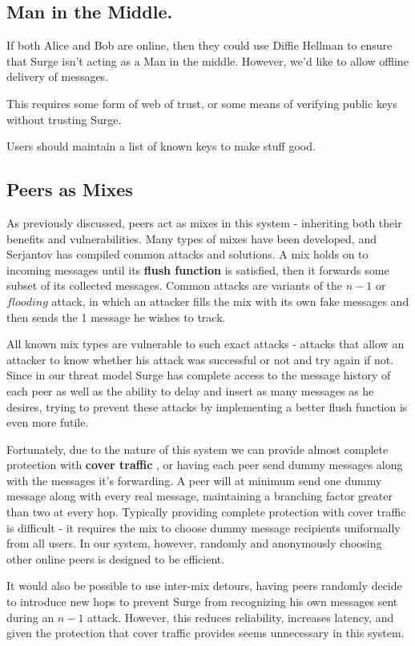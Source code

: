 \documentclass[twocolumn]{paper}
\begin{document}
\subsection{Man in the Middle.} If both Alice and Bob are online, then they could use Diffie Hellman to ensure that Surge isn't acting as a Man in the middle. However, we'd like to allow offline delivery of messages.

This requires some form of web of trust, or some means of verifying public keys without trusting Surge. 

Users should maintain a list of known keys to make stuff good. 

\subsection{Peers as Mixes}
As previously discussed, peers act as mixes in this system - inheriting both their benefits and vulnerabilities. Many types of mixes have been developed, and Serjantov \cite{trickle02} has compiled common attacks and solutions. 
A mix holds on to incoming messages until its \textbf{flush function} is satisfied, then it forwards some subset of its collected messages. Common attacks are variants of the $n - 1$ or $flooding$ attack, in which an attacker fills the mix with its own fake messages and then sends the 1 message he wishes to track. 

All known mix types are vulnerable to such exact attacks \cite{trickle02} -  attacks that allow an attacker to know whether his attack was successful or not and try again if not. Since in our threat model Surge has complete access to the message history of each peer as well as the ability to delay and insert as many messages as he desires, trying to prevent these attacks by implementing a better flush function is even more futile. 

Fortunately, due to the nature of this system we can provide almost complete protection with \textbf{cover traffic} \cite{trickle02}, or having each peer send dummy messages along with the messages it's forwarding. A peer will at minimum send one dummy message along with every real message, maintaining a branching factor greater than two at every hop. Typically providing complete protection with cover traffic is difficult - it requires the mix to choose dummy message recipients uniformally from all users. In our system, however, randomly and anonymously choosing other online peers is designed to be efficient.

It would also be possible to use inter-mix detours\cite{TODO}, having peers randomly decide to introduce new hops to prevent Surge from recognizing his own messages sent during an $n - 1$ attack. However, this reduces reliability, increases latency, and given the protection that cover traffic provides seems unnecessary in this system. 
\end{document}
